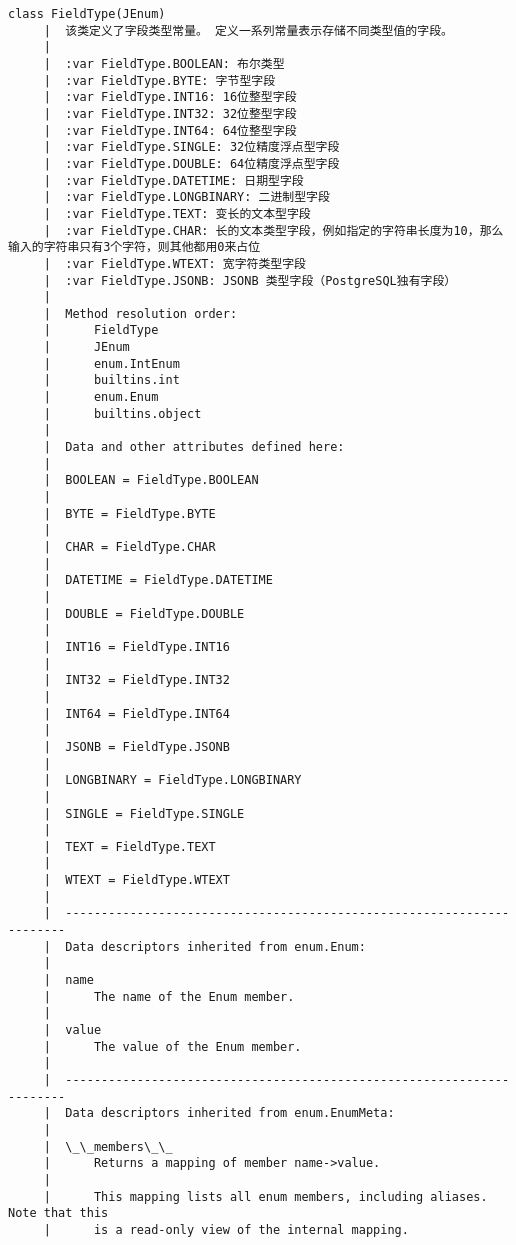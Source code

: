 \documentclass[11pt]{article}
\begin{document}
\begin{Verbatim}[commandchars=\\\{\}]
    class FieldType(JEnum)
     |  该类定义了字段类型常量。 定义一系列常量表示存储不同类型值的字段。
     |  
     |  :var FieldType.BOOLEAN: 布尔类型
     |  :var FieldType.BYTE: 字节型字段
     |  :var FieldType.INT16: 16位整型字段
     |  :var FieldType.INT32: 32位整型字段
     |  :var FieldType.INT64: 64位整型字段
     |  :var FieldType.SINGLE: 32位精度浮点型字段
     |  :var FieldType.DOUBLE: 64位精度浮点型字段
     |  :var FieldType.DATETIME: 日期型字段
     |  :var FieldType.LONGBINARY: 二进制型字段
     |  :var FieldType.TEXT: 变长的文本型字段
     |  :var FieldType.CHAR: 长的文本类型字段，例如指定的字符串长度为10，那么输入的字符串只有3个字符，则其他都用0来占位
     |  :var FieldType.WTEXT: 宽字符类型字段
     |  :var FieldType.JSONB: JSONB 类型字段（PostgreSQL独有字段）
     |  
     |  Method resolution order:
     |      FieldType
     |      JEnum
     |      enum.IntEnum
     |      builtins.int
     |      enum.Enum
     |      builtins.object
     |  
     |  Data and other attributes defined here:
     |  
     |  BOOLEAN = FieldType.BOOLEAN
     |  
     |  BYTE = FieldType.BYTE
     |  
     |  CHAR = FieldType.CHAR
     |  
     |  DATETIME = FieldType.DATETIME
     |  
     |  DOUBLE = FieldType.DOUBLE
     |  
     |  INT16 = FieldType.INT16
     |  
     |  INT32 = FieldType.INT32
     |  
     |  INT64 = FieldType.INT64
     |  
     |  JSONB = FieldType.JSONB
     |  
     |  LONGBINARY = FieldType.LONGBINARY
     |  
     |  SINGLE = FieldType.SINGLE
     |  
     |  TEXT = FieldType.TEXT
     |  
     |  WTEXT = FieldType.WTEXT
     |  
     |  ----------------------------------------------------------------------
     |  Data descriptors inherited from enum.Enum:
     |  
     |  name
     |      The name of the Enum member.
     |  
     |  value
     |      The value of the Enum member.
     |  
     |  ----------------------------------------------------------------------
     |  Data descriptors inherited from enum.EnumMeta:
     |  
     |  \_\_members\_\_
     |      Returns a mapping of member name->value.
     |      
     |      This mapping lists all enum members, including aliases. Note that this
     |      is a read-only view of the internal mapping.
    

\end{Verbatim}
\end{document}
